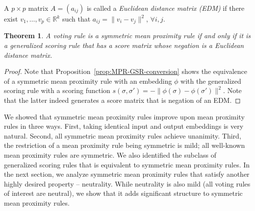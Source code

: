 \documentclass[10pt,letterpaper]{article}
\newcommand{\calL}{{\mathcal{L}}}
\newcommand{\rank}{{\calL(A)}}
\DeclareMathOperator*{\argmax}{arg\,max}
\DeclareMathOperator*{\argmin}{arg\,min}
\newtheorem{theorem}{Theorem}
\newenvironment{definition}[1][Definition]{\begin{trivlist}
\item[\hskip \labelsep {\bfseries #1}]}{\end{trivlist}}
\begin{document}

\begin{definition}[Euclidean Distance Matrix (EDM)]
A $p \times p$ matrix $A = (a_{ij})$ is called a \emph{Euclidean distance matrix (EDM)} if there exist $v_1,\ldots,v_p \in \mathbb{R}^k$ such that $a_{ij} = \|v_i-v_j\|^2$, $\forall i,j$. 
\end{definition}

\begin{theorem}
A voting rule is a symmetric mean proximity rule if and only if it is a generalized scoring rule that has a score matrix whose negation is a Euclidean distance matrix. 
\label{thm:symm}
\end{theorem}
\begin{proof}
Note that Proposition~\ref{prop:MPR-GSR-conversion} shows the equivalence of a symmetric mean proximity rule with an embedding $\phi$ with the generalized scoring rule with a scoring function $s(\sigma,\sigma') = -\|\phi(\sigma)-\phi(\sigma')\|^2$. Note that the latter indeed generates a score matrix that is negation of an EDM.
\begin{comment} %
For the ``if'' direction, given any generalized scoring rule $r$ with score matrix $S$ such that $-S$ is an EDM, we can find $v_1,\ldots,v_{m!} \in \mathbb{R}^k$ such that $S_{ij} = -\|v_i-v_j\|^2$. Take $\phi(\sigma_i) = v_i$ for all $i$. By Proposition~\ref{prop:MPR-GSR-conversion}, 
$$
\argmax_{\sigma \in \rank} \sum_{\sigma' \in \rank} n(\pi,\sigma') \cdot s(\sigma,\sigma') = \argmin_{\sigma \in \rank} \|\phi(\sigma)-mean(\pi)\|.
$$
That is, the rule is a symmetric mean proximity rule. For the ``only if'' direction, given any symmetric mean proximity rule, note that the score matrix created in the proof of Proposition~\ref{prop:equiv} is negation of a Euclidean distance matrix.
\end{comment}
\end{proof}


We showed that symmetric mean proximity rules improve upon mean proximity rules in three ways. First, taking identical input and output embeddings is very natural. Second, all symmetric mean proximity rules achieve unanimity. Third, the restriction of a mean proximity rule being symmetric is mild; all well-known mean proximity rules are symmetric. We also identified the subclass of generalized scoring rules that is equivalent to symmetric mean proximity rules. In the next section, we analyze symmetric mean proximity rules that satisfy another highly desired property -- neutrality. While neutrality is also mild (all voting rules of interest are neutral), we show that it adds significant structure to symmetric mean proximity rules. 
\end{document}
